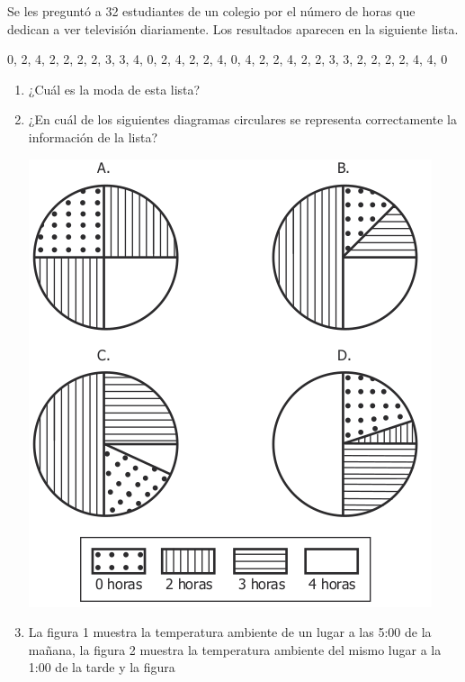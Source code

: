 \documentclass[letterpaper,11pt,twoside]{article}
\begin{document}
\begin{multicols}{2}
Se les preguntó a 32 estudiantes de un colegio por el número de horas que dedican a ver televisión diariamente. Los resultados aparecen en la siguiente lista.
\begin{center}
0, 2, 4, 2, 2, 2, 2, 3, 3, 4, 0, 2, 4, 2, 2, 4, 0, 4, 2, 2, 4, 2, 2, 3, 3, 2, 2, 2, 2, 4, 4, 0
\end{center}
\begin{enumerate}
\item ¿Cuál es la moda de esta lista? \label{q01}
\begin{enumerate}
\end{enumerate}
\item ¿En cuál de los siguientes diagramas circulares se representa correctamente la información de la lista? \label{q02}
\begin{center}
\includegraphics[scale=.5]{Images/Pantallazo-12.png} 
\end{center}
\item La figura 1 muestra la temperatura ambiente de un lugar a las 5:00 de la mañana, la figura 2 muestra la temperatura ambiente del mismo lugar a la 1:00 de la tarde y la figura

\end{enumerate}
\end{multicols}
\end{document}
